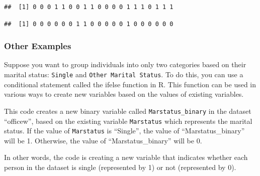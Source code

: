 \documentclass[
]{article}
\newenvironment{Shaded}{\begin{snugshade}}{\end{snugshade}}
\newcommand{\DecValTok}[1]{\textcolor[rgb]{0.00,0.00,0.81}{#1}}
\newcommand{\FunctionTok}[1]{\textcolor[rgb]{0.13,0.29,0.53}{\textbf{#1}}}
\newcommand{\NormalTok}[1]{#1}
\newcommand{\OtherTok}[1]{\textcolor[rgb]{0.56,0.35,0.01}{#1}}
\newcommand{\SpecialCharTok}[1]{\textcolor[rgb]{0.81,0.36,0.00}{\textbf{#1}}}
\newcommand{\StringTok}[1]{\textcolor[rgb]{0.31,0.60,0.02}{#1}}
\begin{document}
\begin{verbatim}
##  [1] 0 0 0 1 1 0 0 1 1 0 0 0 0 1 1 1 0 1 1 1
\end{verbatim}

\begin{Shaded}
\end{Shaded}

\begin{verbatim}
##  [1] 0 0 0 0 0 0 1 1 0 0 0 0 0 1 0 0 0 0 0 0
\end{verbatim}

\hypertarget{other-examples}{%
\subsubsection{Other Examples}\label{other-examples}}

Suppose you want to group individuals into only two categories based on
their marital status: \texttt{Single} and
\texttt{Other\ Marital\ Status}. To do this, you can use a conditional
statement called the ifelse function in R. This function can be used in
various ways to create new variables based on the values of existing
variables.

This code creates a new binary variable called
\texttt{Marstatus\_binary} in the dataset ``officew'', based on the
existing variable \texttt{Marstatus} which represents the marital
status. If the value of \texttt{Marstatus} is ``Single'', the value of
``Marstatus\_binary'' will be 1. Otherwise, the value of
``Marstatus\_binary'' will be 0.

In other words, the code is creating a new variable that indicates
whether each person in the dataset is single (represented by 1) or not
(represented by 0).

\begin{Shaded}
\end{Shaded}
\end{document}
